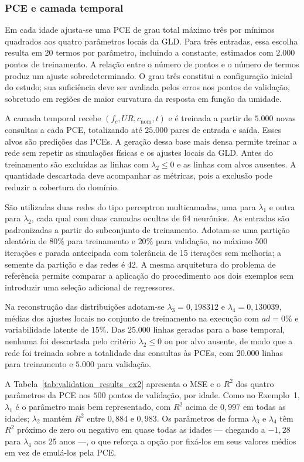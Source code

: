 \subsubsection{PCE e camada temporal}

Em cada idade ajusta-se uma PCE de grau total máximo três por mínimos quadrados aos quatro parâmetros locais da GLD. Para três entradas, essa escolha resulta em 20 termos por parâmetro, incluindo a constante, estimados com $2.000$ pontos de treinamento. A relação entre o número de pontos e o número de termos produz um ajuste sobredeterminado. O grau três constitui a configuração inicial do estudo; sua suficiência deve ser avaliada pelos erros nos pontos de validação, sobretudo em regiões de maior curvatura da resposta em função da umidade.

A camada temporal recebe $(f_c,UR,c_{\mathrm{nom}},t)$ e é treinada a partir de $5.000$ novas consultas a cada PCE, totalizando até $25.000$ pares de entrada e saída. Esses alvos são predições das PCEs. A geração dessa base mais densa permite treinar a rede sem repetir as simulações físicas e os ajustes locais da GLD. Antes do treinamento são excluídas as linhas com $\lambda_2\leq0$ e as linhas com alvos ausentes. A quantidade descartada deve acompanhar as métricas, pois a exclusão pode reduzir a cobertura do domínio.

São utilizadas duas redes do tipo perceptron multicamadas, uma para $\lambda_1$ e outra para $\lambda_2$, cada qual com duas camadas ocultas de 64 neurônios. As entradas são padronizadas a partir do subconjunto de treinamento. Adotam-se uma partição aleatória de $80\%$ para treinamento e $20\%$ para validação, no máximo 500 iterações e parada antecipada com tolerância de 15 iterações sem melhoria; a semente da partição e das redes é 42. A mesma arquitetura do problema de referência permite comparar a aplicação do procedimento aos dois exemplos sem introduzir uma seleção adicional de regressores.

Na reconstrução das distribuições adotam-se $\lambda_3=0{,}198312$ e $\lambda_4=0{,}130039$, médias dos ajustes locais no conjunto de treinamento na execução com $ad=0\%$ e variabilidade latente de $15\%$. Das $25.000$ linhas geradas para a base temporal, nenhuma foi descartada pelo critério $\lambda_2\leq0$ ou por alvo ausente, de modo que a rede foi treinada sobre a totalidade das consultas às PCEs, com $20.000$ linhas para treinamento e $5.000$ para validação.

A Tabela~\ref{tab:validation_results_ex2} apresenta o MSE e o $R^2$ dos quatro parâmetros da PCE nos $500$ pontos de validação, por idade. Como no Exemplo~1, $\lambda_1$ é o parâmetro mais bem representado, com $R^2$ acima de $0{,}997$ em todas as idades; $\lambda_2$ mantém $R^2$ entre $0{,}884$ e $0{,}983$. Os parâmetros de forma $\lambda_3$ e $\lambda_4$ têm $R^2$ próximo de zero ou negativo em quase todas as idades --- chegando a $-1{,}28$ para $\lambda_4$ aos 25 anos ---, o que reforça a opção por fixá-los em seus valores médios em vez de emulá-los pela PCE.

